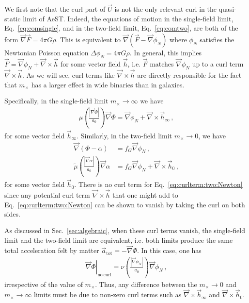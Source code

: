 \documentclass[reprint, amsmath,amssymb, nofootinbib, aps, prd]{revtex4-2}
\begin{document}
We first note that the curl part of $\vec{U}$ is not the only relevant curl in the quasi-static limit of AeST.
Indeed, the equations of motion in the single-field limit, Eq.~\eqref{eq:eomsingle}, and in the two-field limit, Eq.~\eqref{eq:eomtwo}, are both of the form $\vec{\nabla} \vec{F} = 4 \pi G \rho$.
This is equivalent to $\vec{\nabla} (\vec{F} - \vec{\nabla} \phi_N)$ where $\phi_N$ satisfies the Newtonian Poisson equation $\Delta \phi_N = 4\pi G \rho$.
In general, this implies $\vec{F} = \vec{\nabla} \phi_N + \vec{\nabla} \times \vec{h}$ for some vector field $\vec{h}$, i.e. $\vec{F}$ matches $\vec{\nabla} \phi_N$ up to a curl term $\vec{\nabla} \times \vec{h}$.
As we will see, curl terms like $\vec{\nabla} \times \vec{h}$ are directly responsible for the fact that $m_\times$ has a larger effect in wide binaries than in galaxies.

Specifically, in the single-field limit $m_\times \to \infty$ we have
\begin{align}
 \label{eq:curlterm:single}
 \mu\left(\frac{|\vec{\nabla} \Phi|}{a_0}\right) \vec{\nabla} \Phi = \vec{\nabla} \phi_N + \vec{\nabla} \times \vec{h}_\infty \,,
\end{align}
for some vector field $\vec{h}_\infty$.
Similarly, in the two-field limit $m_\times \to 0$, we have
\begin{subequations}
\label{eq:curlterm:two}
\begin{align}
\label{eq:curlterm:two:Newton}
\vec{\nabla} (\Phi - \alpha) &= f_G \vec{\nabla} \phi_N \,, \\
\tilde{\mu}\left(\frac{|\vec{\nabla} \alpha|}{a_0}\right) \vec{\nabla} \alpha &= f_G \vec{\nabla} \phi_N + \vec{\nabla} \times \vec{h}_0 \,,
\end{align}
\end{subequations}
for some vector field $\vec{h}_0$.
There is no curl term for Eq.~\eqref{eq:curlterm:two:Newton} since any potential curl term $\vec{\nabla} \times \vec{h}$ that one might add to Eq.~\eqref{eq:curlterm:two:Newton} can be shown to vanish by taking the curl on both sides.

As discussed in Sec.~\ref{sec:algebraic}, when these curl terms vanish, the single-field limit and the two-field limit are equivalent, i.e. both limits produce the same total acceleration felt by matter $\vec{a}_{\mathrm{tot}} = - \vec{\nabla} \Phi$.
In this case, one has
\begin{align}
 \label{eq:algebraic-fields}
 \left. \vec{\nabla} \Phi\right|_{\mathrm{no\,curl}} = \nu\left(\frac{|\vec{\nabla} \phi_N|}{a_0}\right) \vec{\nabla} \phi_N \,,
\end{align}
irrespective of the value of $m_\times$.
Thus, any difference between the $m_\times \to 0$ and $m_\times \to \infty$ limits must be due to non-zero curl terms such as $\vec{\nabla} \times \vec{h}_\infty$ and $\vec{\nabla} \times \vec{h}_0$.
\end{document}
